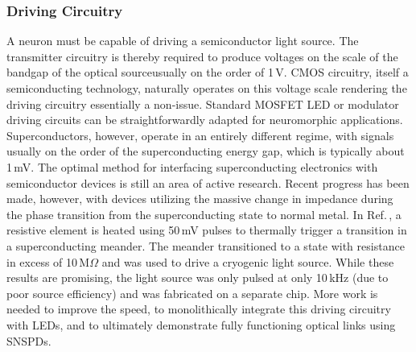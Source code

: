\documentclass[twocolumn]{article}
\begin{document}
\subsubsection{Driving Circuitry}
A neuron must be capable of driving a semiconductor light source. The transmitter circuitry is thereby required to produce voltages on the scale of the bandgap of the optical source\textemdash usually on the order of 1\,V. CMOS circuitry, itself a semiconducting technology, naturally operates on this voltage scale rendering the driving circuitry essentially a non-issue. Standard MOSFET LED or modulator driving circuits \cite{oneforleds,oneformodulators} can be straightforwardly adapted for neuromorphic applications. Superconductors, however, operate in an entirely different regime, with signals usually on the order of the superconducting energy gap, which is typically about 1\,mV. The optimal method for interfacing superconducting electronics with semiconductor devices is still an area of active research. Recent progress has been made, however, with devices utilizing the massive change in impedance during the phase transition from the superconducting state to normal metal. In Ref.\,\cite{mccaughan2019superconducting}, a resistive element is heated using 50\,mV pulses to thermally trigger a transition in a superconducting meander. The meander transitioned to a state with resistance in excess of 10\,M$\Omega$ and was used to drive a cryogenic light source. While these results are promising, the light source was only pulsed at only 10\,kHz (due to poor source efficiency) and was fabricated on a separate chip. More work is needed to improve the speed, to monolithically integrate this driving circuitry with LEDs, and to ultimately demonstrate fully functioning optical links using SNSPDs.
\end{document}
